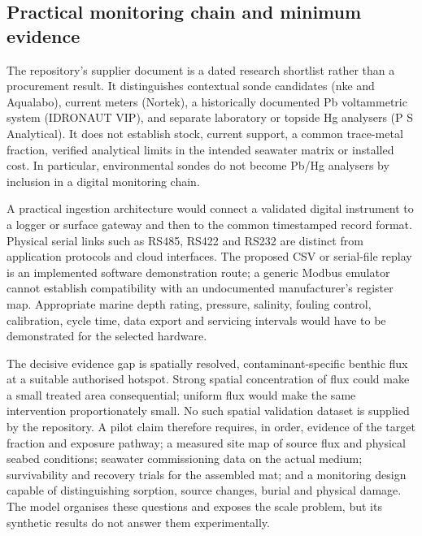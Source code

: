 \subsection{Practical monitoring chain and minimum evidence}

The repository's supplier document is a dated research shortlist rather than a procurement result. It distinguishes contextual sonde candidates (nke and Aqualabo), current meters (Nortek), a historically documented Pb voltammetric system (IDRONAUT VIP), and separate laboratory or topside Hg analysers (P S Analytical). It does not establish stock, current support, a common trace-metal fraction, verified analytical limits in the intended seawater matrix or installed cost. In particular, environmental sondes do not become Pb/Hg analysers by inclusion in a digital monitoring chain.

A practical ingestion architecture would connect a validated digital instrument to a logger or surface gateway and then to the common timestamped record format. Physical serial links such as RS485, RS422 and RS232 are distinct from application protocols and cloud interfaces. The proposed CSV or serial-file replay is an implemented software demonstration route; a generic Modbus emulator cannot establish compatibility with an undocumented manufacturer's register map. Appropriate marine depth rating, pressure, salinity, fouling control, calibration, cycle time, data export and servicing intervals would have to be demonstrated for the selected hardware.

The decisive evidence gap is spatially resolved, contaminant-specific benthic flux at a suitable authorised hotspot. Strong spatial concentration of flux could make a small treated area consequential; uniform flux would make the same intervention proportionately small. No such spatial validation dataset is supplied by the repository. A pilot claim therefore requires, in order, evidence of the target fraction and exposure pathway; a measured site map of source flux and physical seabed conditions; seawater commissioning data on the actual medium; survivability and recovery trials for the assembled mat; and a monitoring design capable of distinguishing sorption, source changes, burial and physical damage. The model organises these questions and exposes the scale problem, but its synthetic results do not answer them experimentally.
